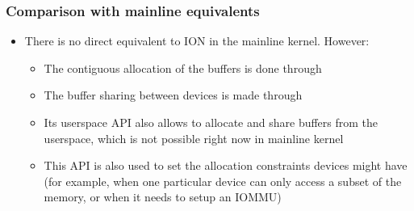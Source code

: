 \begin{frame}
  \frametitle{Comparison with mainline equivalents}
  \begin{itemize}
  \item There is no direct equivalent to ION in the mainline
    kernel. However:
    \begin{itemize}
    \item The contiguous allocation of the buffers is done through
    \item The buffer sharing between devices is made through
    \item Its userspace API also allows to allocate and share buffers
      from the userspace, which is not possible right now in mainline
      kernel
    \item This API is also used to set the allocation constraints
      devices might have (for example, when one particular device can
      only access a subset of the memory, or when it needs to setup an
      IOMMU)
    \end{itemize}
  \end{itemize}
\end{frame}
